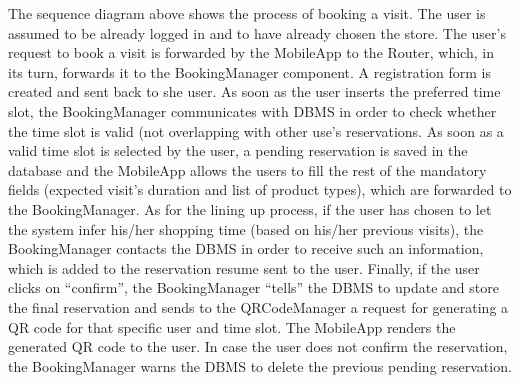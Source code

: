 \documentclass{article}
\begin{document}
The sequence diagram above shows the process of booking a visit. The user is assumed to be already logged in and to have already chosen the store. The user’s request to book a visit is forwarded by the MobileApp to the Router, which, in its turn, forwards it to the BookingManager component. A registration form is created and sent back to she user. As soon as the user inserts the preferred time slot, the BookingManager communicates with DBMS in order to check whether the time slot is valid (not overlapping with other use’s reservations. As soon as a valid time slot is selected by the user, a pending reservation is saved in the database and the MobileApp allows the users to fill the rest of the mandatory fields (expected visit’s duration and list of product types), which are forwarded to the BookingManager. As for the lining up process, if the user has chosen to let the system infer his/her shopping time (based on his/her previous visits), the BookingManager contacts the DBMS in order to receive such an information, which is added to the reservation resume sent to the user. Finally, if the user clicks on “confirm”, the BookingManager “tells” the DBMS to update and store the final reservation and sends to the QRCodeManager a request for generating a QR code for that specific user and time slot. The MobileApp renders the generated QR code to the user. In case the user does not confirm the reservation, the BookingManager warns the DBMS to delete the previous pending reservation.
\end{document}
